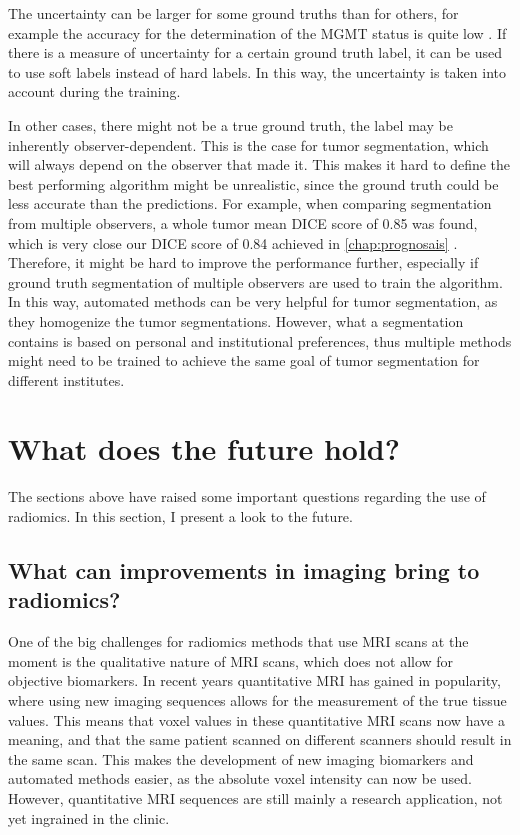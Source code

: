 The uncertainty can be larger for some ground truths than for others, for example the accuracy for the determination of the \gls{MGMT} status is quite low \autocite{wang2017mgmt}.
If there is a measure of uncertainty for a certain ground truth label, it can be used to use soft labels instead of hard labels.
In this way, the uncertainty is taken into account during the training.

In other cases, there might not be a true ground truth, the label may be inherently observer-dependent.
This is the case for \gls{tumor} segmentation, which will always depend on the observer that made it.
This makes it hard to define the best performing algorithm might be unrealistic, since the ground truth could be less accurate than the predictions.
For example, when comparing segmentation from multiple observers, a whole \gls{tumor} mean DICE score of 0.85 was found, which is very close our DICE score of 0.84 achieved in \cref{chap:prognosais} \autocite{menze2015brats}.
Therefore, it might be hard to improve the performance further, especially if ground truth segmentation of multiple observers are used to train the algorithm.
In this way, automated methods can be very helpful for \gls{tumor} segmentation, as they homogenize the \gls{tumor} segmentations.
However, what a segmentation contains is based on personal and institutional preferences, thus multiple methods might need to be trained to achieve the same goal of \gls{tumor} segmentation for different institutes.


\section{What does the future hold?}\label{sec:discussion_future}

The sections above have raised some important questions regarding the use of radiomics.
In this section, I present a look to the future.


\subsection{What can improvements in imaging bring to radiomics?}\label{sec:dicussion_new_imaging}

One of the big challenges for radiomics methods that use \gls{MRI} scans at the moment is the qualitative nature of \gls{MRI} scans, which does not allow for objective biomarkers.
In recent years quantitative \gls{MRI} has gained in popularity, where using new imaging sequences allows for the measurement of the true tissue values.
This means that voxel values in these quantitative \gls{MRI} scans now have a meaning, and that the same patient scanned on different scanners should result in the same scan.
This makes the development of new imaging biomarkers and automated methods easier, as the absolute voxel intensity can now be used.
However, quantitative \gls{MRI} sequences are still mainly a research application, not yet ingrained in the clinic.

